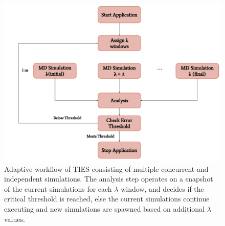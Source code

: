 \begin{figure}
  \centering
  \includegraphics[width=\columnwidth]{figures/adaptive_TIES_workflow_diagram.pdf}
  \caption{Adaptive workflow of TIES consisting of multiple concurrent and
  independent simulations. The analysis step operates on a snapshot of the
  current simulations for each $\lambda$ window, and decides if the critical
  threshold is reached, else the current simulations continue executing and
  new simulations are spawned based on additional $\lambda$ values.}
\label{fig:adaptive_ties}
\end{figure}




